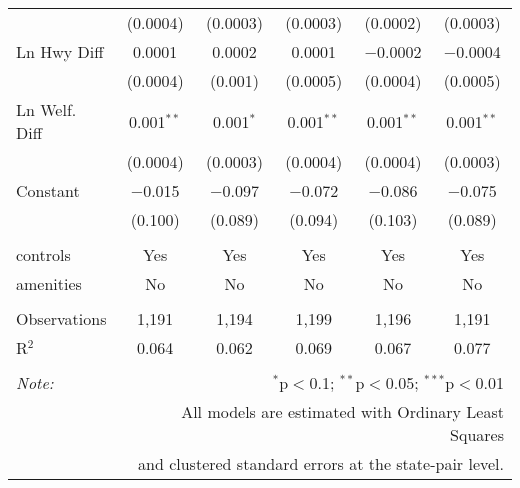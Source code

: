 \begin{table}[!htbp]
\begin{tabular}{@{\extracolsep{5pt}}lccccc}
  & (0.0004) & (0.0003) & (0.0003) & (0.0002) & (0.0003) \\ 
  Ln Hwy Diff & 0.0001 & 0.0002 & 0.0001 & $-$0.0002 & $-$0.0004 \\ 
  & (0.0004) & (0.001) & (0.0005) & (0.0004) & (0.0005) \\ 
  Ln Welf. Diff & 0.001$^{**}$ & 0.001$^{*}$ & 0.001$^{**}$ & 0.001$^{**}$ & 0.001$^{**}$ \\ 
  & (0.0004) & (0.0003) & (0.0004) & (0.0004) & (0.0003) \\ 
  Constant & $-$0.015 & $-$0.097 & $-$0.072 & $-$0.086 & $-$0.075 \\ 
  & (0.100) & (0.089) & (0.094) & (0.103) & (0.089) \\ 
 \hline \\[-1.8ex] 
controls & Yes & Yes & Yes & Yes & Yes \\ 
amenities & No & No & No & No & No \\ 
\hline \\[-1.8ex] 
Observations & 1,191 & 1,194 & 1,199 & 1,196 & 1,191 \\ 
R$^{2}$ & 0.064 & 0.062 & 0.069 & 0.067 & 0.077 \\ 
\hline 
\hline \\[-1.8ex] 
\textit{Note:}  & \multicolumn{5}{r}{$^{*}$p$<$0.1; $^{**}$p$<$0.05; $^{***}$p$<$0.01} \\ 
 & \multicolumn{5}{r}{All models are estimated with Ordinary Least Squares} \\ 
 & \multicolumn{5}{r}{and clustered standard errors at the state-pair level.} \\ 
\end{tabular} 
\end{table} 

